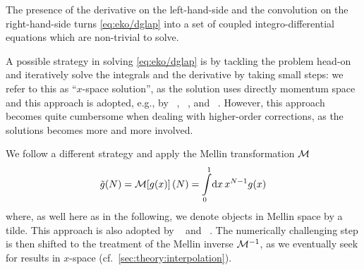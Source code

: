 The presence of the derivative on the left-hand-side and the convolution on the
right-hand-side turns \cref{eq:eko/dglap} into a set of coupled
integro-differential equations which are non-trivial to solve.

A possible strategy in solving \cref{eq:eko/dglap} is by tackling the problem
head-on and iteratively solve the integrals and the derivative by taking small
steps: we refer to this as \enquote{$x$-space solution}, as the solution uses
directly momentum space and this approach is adopted, e.g., by \apfel{}~\cite{Bertone:2013vaa},
\hoppet{}~\cite{Salam:2008qg}, and \qcdnum{}~\cite{Botje:2010ay}.
However, this approach becomes quite cumbersome when dealing with higher-order
corrections, as the solutions becomes more and more involved.

We follow a different strategy and apply the Mellin transformation $\mathcal{M}$
\begin{equation}
    \tilde g(N) = \mathcal{M}\qty[g(x)](N) = \int\limits_0^1\!\dd{x} x^{N-1} g(x)
\end{equation}
where, as well here as in the following, we denote objects in Mellin space by a
tilde.
This approach is also adopted by \pegasus{}~\cite{Vogt:2004ns} and \fk{}~\cite{Ball:2008by,Ball:2010de,DelDebbio:2007ee}.
The numerically challenging step is then shifted to the treatment of the Mellin
inverse $\mathcal{M}^{-1}$, as we eventually seek for results in $x$-space (cf.\
\cref{sec:theory:interpolation}).
